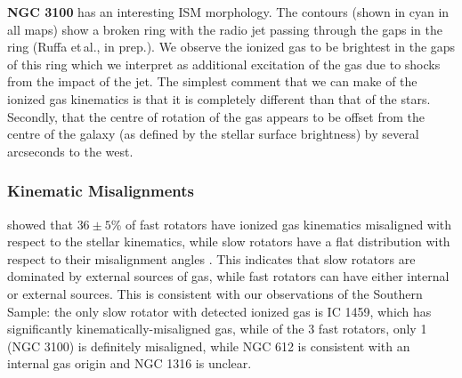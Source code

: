 \documentclass[a4paper,fleqn,usenatbib]{mnras}
\begin{document}


		\textbf{NGC 3100} has an interesting ISM morphology. The  contours (shown in cyan in all maps) show a broken ring with the radio jet passing through the gaps in the ring (Ruffa et\,al., in prep.). We observe the ionized gas to be brightest in the gaps of this ring which we interpret as additional excitation of the gas due to shocks from the impact of the jet. The simplest comment that we can make of the ionized gas kinematics is that it is completely different than that of the stars. Secondly, that the centre of rotation of the gas appears to be offset from the centre of the galaxy (as defined by the stellar surface brightness) by several arcseconds to the west. 

		\subsubsection{Kinematic Misalignments}
			\citet{Davis2011a} showed that $36\pm5$\% of fast rotators have ionized gas kinematics misaligned with respect to the stellar kinematics, while slow rotators have a flat distribution with respect to their misalignment angles \citep[see fig.\ 4]{Davis2011a}. This indicates that slow rotators are dominated by external sources of gas, while fast rotators can have either internal or external sources. This is consistent with our observations of the Southern Sample: the only slow rotator with detected ionized gas is IC 1459, which has significantly kinematically-misaligned gas, while of the 3 fast rotators, only 1 (NGC 3100) is definitely misaligned, while NGC 612 is consistent with an internal gas origin and NGC 1316 is unclear. %
\end{document}
